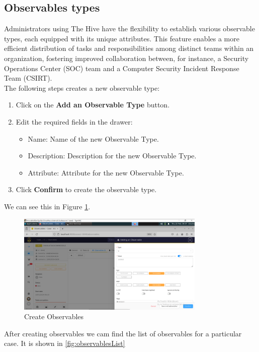 \documentclass{article}
\begin{document}
  \subsection{Observables types}
Administrators using The Hive have the flexibility to establish various observable types, each equipped with its unique attributes. This feature enables a more efficient distribution of tasks and responsibilities among distinct teams within an organization, fostering improved collaboration between, for instance, a Security Operations Center (SOC) team and a Computer Security Incident Response Team (CSIRT).\\
The following steps creates a new observable type: \\
\begin{enumerate}
\item  Click on the \textbf{Add an Observable Type} button.
\item  Edit the required fields in the drawer:
   \begin{itemize}
        \item Name: Name of the new Observable Type.
        \item Description: Description for the new Observable Type.
        \item Attribute: Attribute for the new Observable Type.
    \end{itemize}
\item Click \textbf{Confirm} to create the observable type.
\end{enumerate}

We can see this in Figure \ref{fig:observables}.
\begin{figure}[H]
    \centering
    \includegraphics[width=0.8\textwidth]{img20.png}
    \caption{Create Observables}
    \label{fig:observables}
\end{figure}

After creating observables we cam find the list of observables for a particular case. It is shown in \ref{fig:observablesList}
\end{document}

